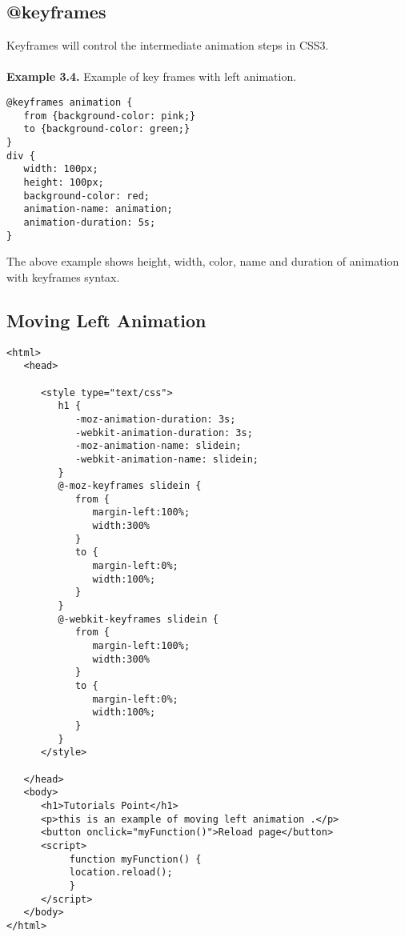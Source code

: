 \documentclass[a4paper,oneside]{book}
\numberwithin{equation}{chapter}
\begin{document}
\subsection{@keyframes}
Keyframes will control the intermediate animation steps in CSS3.\\
\\
\textbf{Example 3.4.} Example of key frames with left animation.
\begin{verbatim}
@keyframes animation {
   from {background-color: pink;}
   to {background-color: green;}
}
div {
   width: 100px;
   height: 100px;
   background-color: red;
   animation-name: animation;
   animation-duration: 5s;
}
\end{verbatim}
The above example shows height, width, color, name and duration of animation with keyframes syntax.
\subsection{Moving Left Animation}
\begin{verbatim}
<html>
   <head>
   
      <style type="text/css">
         h1 {
            -moz-animation-duration: 3s;
            -webkit-animation-duration: 3s;
            -moz-animation-name: slidein;
            -webkit-animation-name: slidein;
         }
         @-moz-keyframes slidein {
            from {
               margin-left:100%;
               width:300%
            }
            to {
               margin-left:0%;
               width:100%;
            }
         }
         @-webkit-keyframes slidein {
            from {
               margin-left:100%;
               width:300%
            }
            to {
               margin-left:0%;
               width:100%;
            }
         }
      </style>
      
   </head>
   <body>
      <h1>Tutorials Point</h1>
      <p>this is an example of moving left animation .</p>
	  <button onclick="myFunction()">Reload page</button>
      <script>
           function myFunction() {
           location.reload();
           }
      </script>
   </body>
</html>
\end{verbatim}
\end{document}
